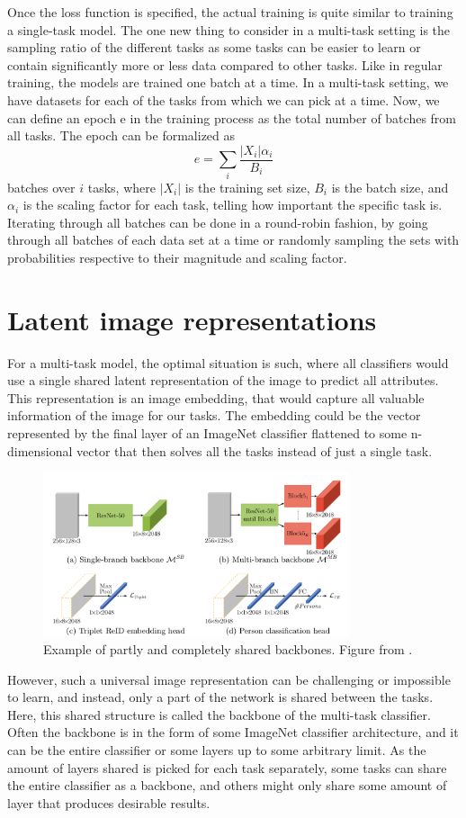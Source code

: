 Once the loss function is specified, the actual training is quite similar to training a single-task model.
The one new thing to consider in a multi-task setting is the sampling ratio of the different tasks as some tasks can be easier to learn or contain significantly more or less data compared to other tasks.
Like in regular training, the models are trained one batch at a time.
In a multi-task setting, we have datasets for each of the tasks from which we can pick at a time.
Now, we can define an epoch e in the training process as the total number of batches from all tasks.
The epoch can be formalized as \[ e = \sum_i{ \dfrac{|X_i| \alpha_i}{B_i}}\] \noindent batches over $i$ tasks, where $|X_i|$ is the training set size, $B_i$ is the batch size, and $\alpha_i$ is the scaling factor for each task, telling how important the specific task is.
Iterating through all batches can be done in a round-robin fashion, by going through all batches of each data set at a time or randomly sampling the sets with probabilities respective to their magnitude and scaling factor.

\section{Latent image representations}
For a multi-task model, the optimal situation is such, where all classifiers would use a single shared latent representation of the image to predict all attributes.
This representation is an image embedding, that would capture all valuable information of the image for our tasks.
The embedding could be the vector represented by the final layer of an ImageNet classifier flattened to some n-dimensional vector that then solves all the tasks instead of just a single task.
\begin{figure}[h!]
    \centering
    \includegraphics[width=0.8\textwidth]{imgs/sharedBackbone.png}
    \caption{Example of partly and completely shared backbones. Figure from \citep{visualPerson}.\label{fig:params}}
\end{figure}
However, such a universal image representation can be challenging or impossible to learn, and instead, only a part of the network is shared between the tasks.
Here, this shared structure is called the backbone of the multi-task classifier.
Often the backbone is in the form of some ImageNet classifier architecture, and it can be the entire classifier or some layers up to some arbitrary limit.
As the amount of layers shared is picked for each task separately, some tasks can share the entire classifier as a backbone, and others might only share some amount of layer that produces desirable results.

